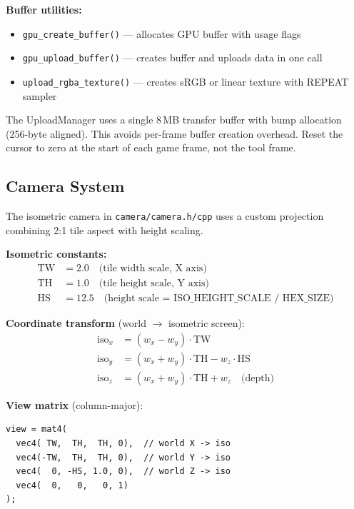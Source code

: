 \documentclass[11pt,a4paper]{article}
\begin{document}
\textbf{Buffer utilities:}
\begin{itemize}
  \item \texttt{gpu\_create\_buffer()} --- allocates GPU buffer with usage flags
  \item \texttt{gpu\_upload\_buffer()} --- creates buffer and uploads data in one call
  \item \texttt{upload\_rgba\_texture()} --- creates sRGB or linear texture with REPEAT sampler
\end{itemize}

\begin{howtip}
The UploadManager uses a single 8\,MB transfer buffer with bump allocation (256-byte aligned). This avoids per-frame buffer creation overhead. Reset the cursor to zero at the start of each game frame, not the tool frame.
\end{howtip}

\subsection{Camera System}
\label{sec:camera}

The isometric camera in \texttt{camera/camera.h/cpp} uses a custom projection combining 2:1 tile aspect with height scaling.

\textbf{Isometric constants:}
\begin{align}
  \text{TW} &= 2.0 \quad \text{(tile width scale, X axis)} \\
  \text{TH} &= 1.0 \quad \text{(tile height scale, Y axis)} \\
  \text{HS} &= 12.5 \quad \text{(height scale = ISO\_HEIGHT\_SCALE / HEX\_SIZE)}
\end{align}

\textbf{Coordinate transform} (world $\to$ isometric screen):
\begin{align}
  \text{iso}_x &= (w_x - w_y) \cdot \text{TW} \\
  \text{iso}_y &= (w_x + w_y) \cdot \text{TH} - w_z \cdot \text{HS} \\
  \text{iso}_z &= (w_x + w_y) \cdot \text{TH} + w_z \quad \text{(depth)}
\end{align}

\textbf{View matrix} (column-major):
\begin{lstlisting}
view = mat4(
  vec4( TW,  TH,  TH, 0),  // world X -> iso
  vec4(-TW,  TH,  TH, 0),  // world Y -> iso
  vec4(  0, -HS, 1.0, 0),  // world Z -> iso
  vec4(  0,   0,   0, 1)
);
\end{lstlisting}
\end{document}
